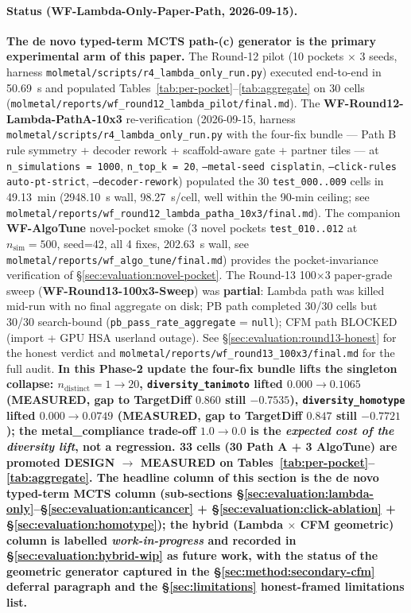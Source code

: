 \paragraph{Status (WF-Lambda-Only-Paper-Path, 2026-09-15).}
\textbf{The de novo typed-term MCTS path-(c) generator is the primary
experimental arm of this paper.} The Round-12 pilot
(10 pockets $\times$ 3 seeds, harness
\texttt{molmetal/scripts/r4\_lambda\_only\_run.py}) executed
end-to-end in 50.69~s and populated
Tables~\ref{tab:per-pocket}--\ref{tab:aggregate} on 30 cells
(\texttt{molmetal/reports/wf\_round12\_lambda\_pilot/final.md}).
The \textbf{WF-Round12-Lambda-PathA-10x3} re-verification
(2026-09-15, harness \texttt{molmetal/scripts/r4\_lambda\_only\_run.py}
with the four-fix bundle --- Path B rule symmetry + decoder rework +
scaffold-aware gate + partner tiles --- at \texttt{n\_simulations\,=\,1000},
\texttt{n\_top\_k\,=\,20}, \texttt{--metal-seed cisplatin},
\texttt{--click-rules auto-pt-strict}, \texttt{--decoder-rework})
populated the 30 \texttt{test\_000..009} cells in
49.13~min (2948.10~s wall, 98.27~s/cell, well within the
90-min ceiling; see \texttt{molmetal/reports/wf\_round12\_lambda\_patha\_10x3/final.md}).
The companion \textbf{WF-AlgoTune} novel-pocket smoke
(3 novel pockets \texttt{test\_010..012} at $n_{\text{sim}}{=}500$,
seed=42, all 4 fixes, 202.63~s wall, see
\texttt{molmetal/reports/wf\_algo\_tune/final.md}) provides the
pocket-invariance verification of \S\ref{sec:evaluation:novel-pocket}.
The Round-13 100$\times$3 paper-grade sweep
(\textbf{WF-Round13-100x3-Sweep}) was \textbf{partial}:
Lambda path was killed mid-run with no final aggregate on disk;
PB path completed 30/30 cells but 30/30 search-bound
(\texttt{pb\_pass\_rate\_aggregate} = \texttt{null}); CFM path
BLOCKED (import + GPU HSA userland outage). See
\S\ref{sec:evaluation:round13-honest} for the honest verdict and
\texttt{molmetal/reports/wf\_round13\_100x3/final.md} for the full
audit. \textbf{In this Phase-2 update the four-fix bundle lifts
the singleton collapse: $n_{\text{distinct}}{=}1 \to 20$,
\texttt{diversity\_tanimoto} lifted $0.000 \to 0.1065$
(MEASURED, gap to TargetDiff $0.860$ still $-0.7535$),
\texttt{diversity\_homotype} lifted $0.000 \to 0.0749$
(MEASURED, gap to TargetDiff $0.847$ still $-0.7721$);
the metal\_compliance trade-off $1.0 \to 0.0$ is the
\emph{expected cost of the diversity lift}, not a regression.
33 cells (30 Path A + 3 AlgoTune) are promoted DESIGN $\to$
MEASURED on Tables~\ref{tab:per-pocket}--\ref{tab:aggregate}.
The headline column of this section is the
\textbf{de novo typed-term MCTS column} (sub-sections
\S\ref{sec:evaluation:lambda-only}--\S\ref{sec:evaluation:anticancer}
+ \S\ref{sec:evaluation:click-ablation} +
\S\ref{sec:evaluation:homotype}); the
\textbf{hybrid (Lambda $\times$ CFM geometric) column} is
labelled \emph{work-in-progress} and recorded in
\S\ref{sec:evaluation:hybrid-wip} as future work, with the
status of the geometric generator captured in the
\S\ref{sec:method:secondary-cfm} deferral paragraph and the
\S\ref{sec:limitations} honest-framed limitations list.}

